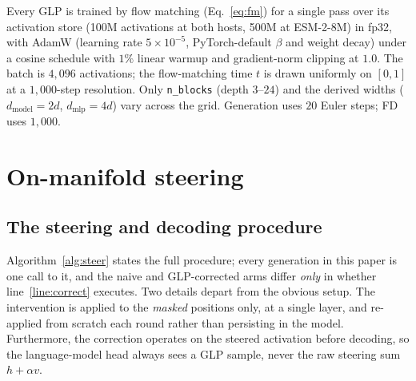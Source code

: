 \documentclass{article}
\begin{document}
Every GLP is trained by flow matching (Eq.~\ref{eq:fm}) for a single pass over its activation
store (100M activations at both hosts, 500M at ESM-2-8M) in fp32, with AdamW (learning rate
$5\times10^{-5}$, PyTorch-default $\beta$ and weight decay) under a cosine schedule with $1\%$
linear warmup and gradient-norm clipping at $1.0$. The batch is $4{,}096$ activations; the
flow-matching time $t$ is drawn uniformly on $[0,1]$ at a $1{,}000$-step resolution. Only
\texttt{n\_blocks} (depth $3$--$24$) and the derived widths ($d_{\text{model}}{=}2d$,
$d_{\text{mlp}}{=}4d$) vary across the grid. Generation uses $20$ Euler steps; FD uses
$1{,}000$.

\section{On-manifold steering}
\label{app:steering}

\subsection{The steering and decoding procedure}
\label{app:steer-algo}

Algorithm~\ref{alg:steer} states the full procedure; every generation in this paper is one call
to it, and the naive and GLP-corrected arms differ \emph{only} in whether
line~\ref{line:correct} executes. Two details depart from the obvious setup. The intervention is
applied to the \emph{masked} positions only, at a single layer, and re-applied from scratch each
round rather than persisting in the model. Furthermore, the correction operates on the steered activation before decoding, so the language-model head always sees a GLP sample, never the raw steering sum
$h + \alpha v$.
\end{document}
